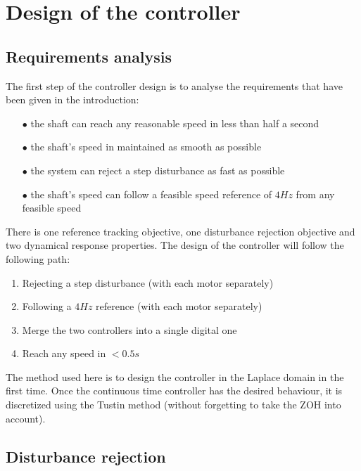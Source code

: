 \setcounter{secnumdepth}{1}

\chapter{Design of the controller}

\section{Requirements analysis}

The first step of the controller design is to analyse the requirements that have been given in the introduction:

\begin{enumerate}
    \item[$\bullet$] the shaft can reach any reasonable speed in less than half a second
    \item[$\bullet$] the shaft's speed in maintained as smooth as possible
    \item[$\bullet$] the system can reject a step disturbance as fast as possible
    \item[$\bullet$] the shaft's speed can follow a feasible speed reference of $4 Hz$ from any feasible speed
\end{enumerate}

There is one reference tracking objective, one disturbance rejection objective and two dynamical response properties.
The design of the controller will follow the following path:

\begin{enumerate}
    \item Rejecting a step disturbance (with each motor separately)
    \item Following a $4 Hz$ reference (with each motor separately)
    \item Merge the two controllers into a single digital one
    \item Reach any speed in $< 0.5 s$
\end{enumerate}

The method used here is to design the controller in the Laplace domain in the first time. Once the continuous time
controller has the desired behaviour, it is discretized using the Tustin method (without forgetting to take the
ZOH into account).

\section{Disturbance rejection}

